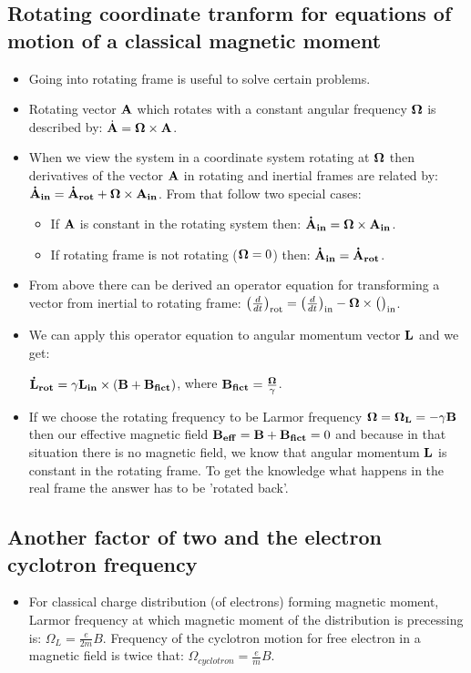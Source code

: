 \documentclass[AtomicOptical1Notes.tex]{subfiles}
\begin{document}
	\subsection{Rotating coordinate tranform for equations of motion of a classical magnetic moment}
		\begin{itemize}
			\item Going into rotating frame is useful to solve certain problems.
			\item Rotating vector $\mathbf{A}$ which rotates with a constant angular frequency $\mathbf{\Omega}$ is described by: $\dot{\mathbf{A}}=\mathbf{\Omega}\times\mathbf{A}$.
			\item When we view the system in a coordinate system rotating at $\mathbf{\Omega}$ then derivatives of the vector $\mathbf{A}$ in rotating and inertial frames are related by: $ \mathbf{\dot A_{in}} = \mathbf{\dot A_{rot}} + \mathbf{\Omega}\times\mathbf{A_{in}} $. From that follow two special cases: 
				\begin{itemize}
					\item If $\mathbf{A}$ is constant in the rotating system then: $ \mathbf{\dot A_{in}} = \mathbf{\Omega}\times\mathbf{A_{in}} $.
					\item If rotating frame is not rotating ($\mathbf{\Omega} = 0$) then: $ \mathbf{\dot A_{in}} = \mathbf{\dot A_{rot}} $.
				\end{itemize}
			\item From above there can be derived an operator equation for transforming a vector from inertial to rotating frame: $\left(\frac{d}{dt}\right)_\text{rot} = \left(\frac{d}{dt}\right)_\text{in} - {\bf{\Omega}} \times\big(\big)_\text{in}$.
			\item We can apply this operator equation to angular momentum vector $\mathbf{L}$ and we get:
			
			$ \mathbf{\dot L_{rot}} = \gamma\mathbf{L_{in}}\times(\mathbf{B}+\mathbf{B_{fict}}) $, where $ \mathbf{B_{fict}}=\frac{\mathbf{\Omega}}{\gamma} $.
			\item If we choose the rotating frequency to be Larmor frequency $\mathbf{\Omega} = \mathbf{\Omega_L} = -\gamma\mathbf{B}$ then our effective magnetic field $ \mathbf{B_{eff}} = \mathbf{B}+\mathbf{B_{fict}} = 0 $ and because in that situation there is no magnetic field, we know that angular momentum $\mathbf{L}$ is constant in the rotating frame. To get the knowledge what happens in the real frame the answer has to be 'rotated back'.
		\end{itemize}
	
	\subsection{Another factor of two and the electron cyclotron frequency}
		\begin{itemize}
			\item For classical charge distribution (of electrons) forming magnetic moment, Larmor frequency at which magnetic moment of the distribution is precessing is: $\Omega_L = \frac{e}{2m}B$. Frequency of the cyclotron motion for free electron in a magnetic field is twice that: $\Omega_{cyclotron} = \frac{e}{m}B$.
		\end{itemize}
\end{document}
